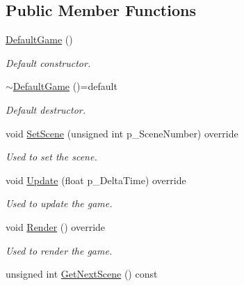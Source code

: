 \subsection*{Public Member Functions}
\begin{DoxyCompactItemize}
\item 
\mbox{\label{class_default_game_a3d5118ab258f159807210825a925ad1d}} 
\mbox{\hyperlink{class_default_game_a3d5118ab258f159807210825a925ad1d}{Default\+Game}} ()
\begin{DoxyCompactList}\small\item\em Default constructor. \end{DoxyCompactList}\item 
\mbox{\label{class_default_game_a4b6d4c6602bd89314da6bd9eb8bd36a7}} 
\mbox{\hyperlink{class_default_game_a4b6d4c6602bd89314da6bd9eb8bd36a7}{$\sim$\+Default\+Game}} ()=default
\begin{DoxyCompactList}\small\item\em Default destructor. \end{DoxyCompactList}\item 
void \mbox{\hyperlink{class_default_game_ad5cc1efff4785b26da69b4dc942cc9fd}{Set\+Scene}} (unsigned int p\+\_\+\+Scene\+Number) override
\begin{DoxyCompactList}\small\item\em Used to set the scene. \end{DoxyCompactList}\item 
void \mbox{\hyperlink{class_default_game_a51e32950165cab20f9ba4e06bfc13e2f}{Update}} (float p\+\_\+\+Delta\+Time) override
\begin{DoxyCompactList}\small\item\em Used to update the game. \end{DoxyCompactList}\item 
\mbox{\label{class_default_game_a63953b59a10867319a09ae8393af8cff}} 
void \mbox{\hyperlink{class_default_game_a63953b59a10867319a09ae8393af8cff}{Render}} () override
\begin{DoxyCompactList}\small\item\em Used to render the game. \end{DoxyCompactList}\item 
unsigned int \mbox{\hyperlink{class_default_game_a2962282bb0a25d369532c083de9edf8f}{Get\+Next\+Scene}} () const

\end{DoxyCompactItemize}
